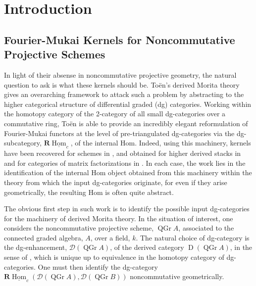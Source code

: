 \chapter{Introduction}
\section*{Fourier-Mukai Kernels for Noncommutative Projective Schemes}

In light of their absense in noncommutative projective geometry, the natural question to ask is what these kernels should be.
To\"en's derived Morita theory \parencite{Toen07} gives an overarching framework to attack such a problem by abstracting to the higher categorical structure of differential graded (dg) categories.
Working within the homotopy category of the 2-category of all small dg-categories over a commutative ring, To\"en is able to provide an incredibly elegant reformulation of Fourier-Mukai functors at the level of pre-triangulated dg-categories via the dg-subcategory, \(\mathbf{R}\underline{\operatorname{Hom}}_c\), of the internal Hom.
Indeed, using this machinery, kernels have been recovered for schemes in \textcite{Toen07}, and obtained for higher derived stacks in \textcite{BFN10} and for categories of matrix factorizations in \textcite{Dyckerhoff11,PV12,BFK14}.
In each case, the work lies in the identification of the internal Hom object obtained from this machinery within the theory from which the input dg-categories originate, for even if they arise geometrically, the resulting Hom is often quite abstract.

The obvious first step in such work is to identify the possible input dg-categories for the machinery of derived Morita theory.
In the situation of interest, one considers the noncommutative projective scheme, \(\operatorname{QGr} A\), associated to the connected graded algebra, \(A\), over a field, \(k\). 
The natural choice of dg-category is the dg-enhancement, \(\mathcal{D}(\operatorname{QGr} A)\), of the derived category \(\operatorname{D}(\operatorname{QGr} A)\), in the sense of \textcite{Lunts-Orlov}, which is unique up to equivalence in the homotopy category of dg-categories.
One must then identify the dg-category \(\mathbf{R}\underline{\operatorname{Hom}}_c(\mathcal{D}(\operatorname{QGr} A), \mathcal{D}(\operatorname{QGr} B))\) noncommutative geometrically.

